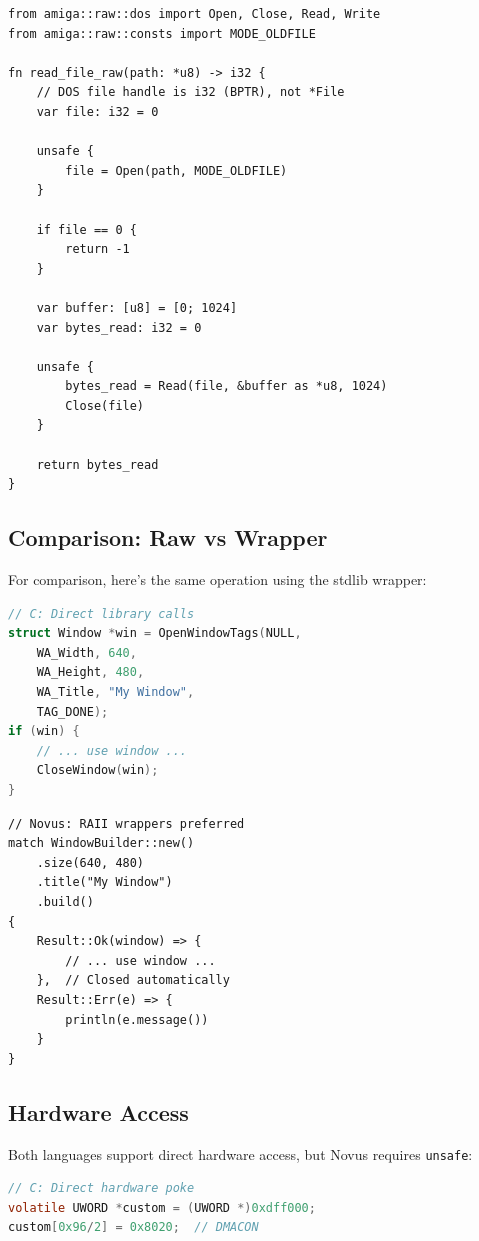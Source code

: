 \begin{lstlisting}
from amiga::raw::dos import Open, Close, Read, Write
from amiga::raw::consts import MODE_OLDFILE

fn read_file_raw(path: *u8) -> i32 {
    // DOS file handle is i32 (BPTR), not *File
    var file: i32 = 0

    unsafe {
        file = Open(path, MODE_OLDFILE)
    }

    if file == 0 {
        return -1
    }

    var buffer: [u8] = [0; 1024]
    var bytes_read: i32 = 0

    unsafe {
        bytes_read = Read(file, &buffer as *u8, 1024)
        Close(file)
    }

    return bytes_read
}
\end{lstlisting}

\subsection{Comparison: Raw vs Wrapper}

For comparison, here's the same operation using the stdlib wrapper:

\begin{lstlisting}[language=C]
// C: Direct library calls
struct Window *win = OpenWindowTags(NULL,
    WA_Width, 640,
    WA_Height, 480,
    WA_Title, "My Window",
    TAG_DONE);
if (win) {
    // ... use window ...
    CloseWindow(win);
}
\end{lstlisting}

\begin{lstlisting}
// Novus: RAII wrappers preferred
match WindowBuilder::new()
    .size(640, 480)
    .title("My Window")
    .build()
{
    Result::Ok(window) => {
        // ... use window ...
    },  // Closed automatically
    Result::Err(e) => {
        println(e.message())
    }
}
\end{lstlisting}

\subsection{Hardware Access}

Both languages support direct hardware access, but Novus requires \texttt{unsafe}:

\begin{lstlisting}[language=C]
// C: Direct hardware poke
volatile UWORD *custom = (UWORD *)0xdff000;
custom[0x96/2] = 0x8020;  // DMACON
\end{lstlisting}


